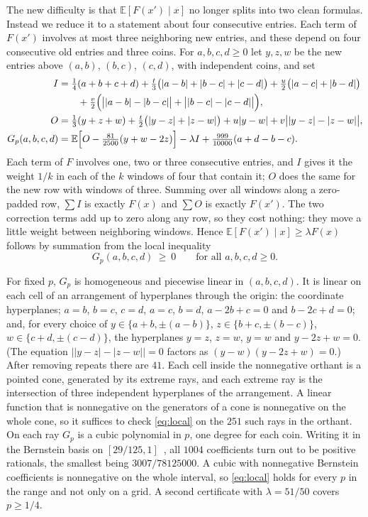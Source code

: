 \documentclass[11pt]{article}
\theoremstyle{remark}
\newcommand{\E}{\mathbb{E}}
\begin{document}
The new difficulty is that $\E[F(x')\mid x]$ no longer splits into two clean formulas. Instead we reduce it to a statement about four consecutive entries. Each term of $F(x')$ involves at most three neighboring new entries, and these depend on four consecutive old entries and three coins. For $a,b,c,d\ge0$ let $y,z,w$ be the new entries above $(a,b)$, $(b,c)$, $(c,d)$, with independent coins, and set
\begin{align*}
I&=\tfrac14(a+b+c+d)+\tfrac t3\bigl(|a-b|+|b-c|+|c-d|\bigr)+\tfrac u2\bigl(|a-c|+|b-d|\bigr)\\
&\qquad+\tfrac v2\Bigl(\bigl||a-b|-|b-c|\bigr|+\bigl||b-c|-|c-d|\bigr|\Bigr),\\
O&=\tfrac13(y+z+w)+\tfrac t2\bigl(|y-z|+|z-w|\bigr)+u|y-w|+v\bigl||y-z|-|z-w|\bigr|,\\
G_p(a,b,c,d)&=\E\Bigl[O-\tfrac{81}{2500}(y+w-2z)\Bigr]-\lambda I+\tfrac{999}{10000}(a+d-b-c).
\end{align*}
Each term of $F$ involves one, two or three consecutive entries, and $I$ gives it the weight $1/k$ in each of the $k$ windows of four that contain it; $O$ does the same for the new row with windows of three. Summing over all windows along a zero-padded row, $\sum I$ is exactly $F(x)$ and $\sum O$ is exactly $F(x')$. The two correction terms add up to zero along any row, so they cost nothing: they move a little weight between neighboring windows. Hence $\E[F(x')\mid x]\ge\lambda F(x)$ follows by summation from the local inequality
\begin{equation}\label{eq:local}
G_p(a,b,c,d)\ \ge\ 0\qquad\text{for all }a,b,c,d\ge0.
\end{equation}

For fixed $p$, $G_p$ is homogeneous and piecewise linear in $(a,b,c,d)$. It is linear on each cell of an arrangement of hyperplanes through the origin: the coordinate hyperplanes; $a=b$, $b=c$, $c=d$, $a=c$, $b=d$, $a-2b+c=0$ and $b-2c+d=0$; and, for every choice of $y\in\{a+b,\pm(a-b)\}$, $z\in\{b+c,\pm(b-c)\}$, $w\in\{c+d,\pm(c-d)\}$, the hyperplanes $y=z$, $z=w$, $y=w$ and $y-2z+w=0$. (The equation $\bigl||y-z|-|z-w|\bigr|=0$ factors as $(y-w)(y-2z+w)=0$.) After removing repeats there are $41$. Each cell inside the nonnegative orthant is a pointed cone, generated by its extreme rays, and each extreme ray is the intersection of three independent hyperplanes of the arrangement. A linear function that is nonnegative on the generators of a cone is nonnegative on the whole cone, so it suffices to check \eqref{eq:local} on the $251$ such rays in the orthant. On each ray $G_p$ is a cubic polynomial in $p$, one degree for each coin. Writing it in the Bernstein basis on $[29/125,1]$~\cite{Farouki}, all $1004$ coefficients turn out to be positive rationals, the smallest being $3007/78125000$. A cubic with nonnegative Bernstein coefficients is nonnegative on the whole interval, so \eqref{eq:local} holds for every $p$ in the range and not only on a grid. A second certificate with $\lambda=51/50$ covers $p\ge1/4$.
\end{document}
